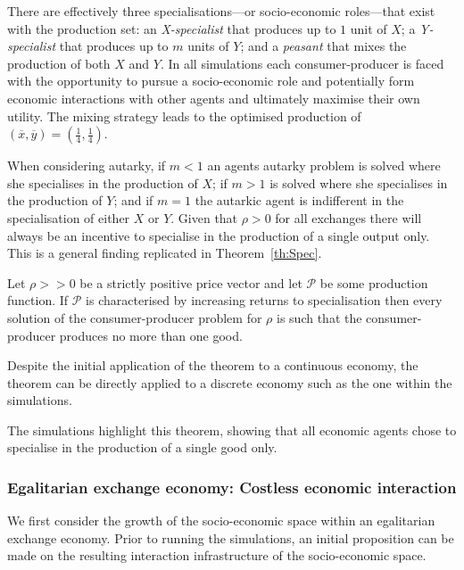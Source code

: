 There are effectively three specialisations---or socio-economic roles---that exist with the production set: an \emph{X-specialist} that produces up to $1$ unit of $X$; a \emph{Y-specialist} that produces up to $m$ units of $Y$; and a \emph{peasant} that mixes the production of both $X$ and $Y$. In all simulations each consumer-producer is faced with the opportunity to pursue a socio-economic role and potentially form economic interactions with other agents and ultimately maximise their own utility. The mixing strategy leads to the optimised production of $(\overline{x},\overline{y})=\left( \frac{1}{4},\frac{1}{4} \right)$.

When considering autarky, if $m<1$ an agents autarky problem is solved where she specialises in the production of $X$; if $m>1$ is solved where she specialises in the production of $Y$; and if $m=1$ the autarkic agent is indifferent in the specialisation of either $X$ or $Y$. Given that $\rho>0$ for all exchanges there will always be an incentive to specialise in the production of a single output only. This is a general finding replicated in Theorem~\ref{th:Spec}. 

\begin{theorem} \label{th:Spec}
Let $\rho >> 0$ be a strictly positive price vector and let $\mathcal{P}$ be some production function. If $\mathcal{P}$ is characterised by increasing returns to specialisation then every solution of the consumer-producer problem for $\rho$ is such that the consumer-producer produces no more than one good.
\end{theorem}

Despite the initial application of the theorem to a continuous economy, the theorem can be directly applied to a discrete economy such as the one within the simulations.

The simulations highlight this theorem, showing that all economic agents chose to specialise in the production of a single good only.

\subsubsection{Egalitarian exchange economy: Costless economic interaction}

We first consider the growth of the socio-economic space within an egalitarian exchange economy. Prior to running the simulations, an initial proposition can be made on the resulting interaction infrastructure of the socio-economic space.

